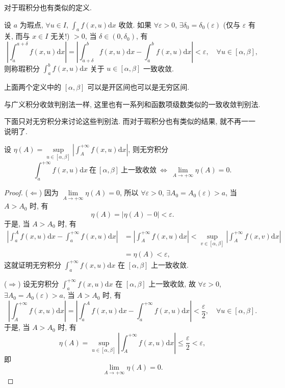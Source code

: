对于瑕积分也有类似的定义.

\begin{definition}\label{def:15.2.2}
设 $a$ 为瑕点, $\forall u\in I$, $\displaystyle\int_{a}f(x,u)\mathrm{d}x$ 收敛. 如果 $\forall\varepsilon>0$, $\exists\delta_{0}=\delta_{0}(\varepsilon)$ (仅与 $\varepsilon$ 有关, 而与 $x\in I$ 无关!) $>0$, 当 $\delta\in(0,\delta_{0})$, 有
\[
  \left|\int_{a}^{a+\delta}f(x,u)\mathrm{d}x\right|=\left|\int_{a+\delta}^{b}f(x,u)\mathrm{d}x-\int_{a}^{b}f(x,u)\mathrm{d}x\right|<\varepsilon,\quad\forall u\in[\alpha,\beta],
\]
则称瑕积分 $\displaystyle\int_{a}^{b}f(x,u)\mathrm{d}x$ 关于 $u\in[\alpha,\beta]$ 一致收敛.
\end{definition}

上面两个定义中的 $[\alpha,\beta]$ 可以是开区间也可以是无穷区间.

与广义积分收敛判别法一样, 这里也有一系列和函数项级数类似的一致收敛判别法.

下面只对无穷积分来讨论这些判别法. 而对于瑕积分也有类似的结果, 就不再一一说明了.

\begin{theorem}\label{thm:15.2.1}
设 $\eta(A)=\sup\limits_{u\in[\alpha,\beta]}\left|\int_{A}^{+\infty}f(x,u)\mathrm{d}x\right|$, 则无穷积分
\[
  \int_{a}^{+\infty}f(x,u)\mathrm{d}x\ \text{在}\ [\alpha,\beta]\ \text{上一致收敛}\ \Leftrightarrow\ \lim_{A\to+\infty}\eta(A)=0.
\]
\end{theorem}

\begin{proof}
($\Leftarrow$) 因为 $\lim\limits_{A\to+\infty}\eta(A)=0$, 所以 $\forall\varepsilon>0$, $\exists A_{0}=A_{0}(\varepsilon)>a$, 当 $A>A_{0}$ 时, 有
\[
  \eta(A)=|\eta(A)-0|<\varepsilon.
\]
于是, 当 $A>A_{0}$ 时, 有
\[
  \begin{aligned}
    \left|\int_{a}^{A}f(x,u)\mathrm{d}x-\int_{a}^{+\infty}f(x,u)\mathrm{d}x\right|&=\left|\int_{A}^{+\infty}f(x,u)\mathrm{d}x\right|<\sup_{v\in[\alpha,\beta]}\left|\int_{A}^{+\infty}f(x,v)\mathrm{d}x\right|\\
    &=\eta(A)<\varepsilon,
  \end{aligned}
\]
这就证明无穷积分 $\displaystyle\int_{a}^{+\infty}f(x,u)\mathrm{d}x$ 在 $[\alpha,\beta]$ 上一致收敛.

($\Rightarrow$) 设无穷积分 $\displaystyle\int_{a}^{+\infty}f(x,u)\mathrm{d}x$ 在 $[\alpha,\beta]$ 上一致收敛, 故 $\forall\varepsilon>0$, $\exists A_{0}=A_{0}(\varepsilon)>a$, 当 $A>A_{0}$ 时, 有
\[
  \left|\int_{A}^{+\infty}f(x,u)\mathrm{d}x\right|=\left|\int_{a}^{A}f(x,u)\mathrm{d}x-\int_{a}^{+\infty}f(x,u)\mathrm{d}x\right|<\frac{\varepsilon}{2},\quad\forall u\in[\alpha,\beta].
\]
于是, 当 $A>A_{0}$ 时, 有
\[
  \eta(A)=\sup_{u\in[\alpha,\beta]}\left|\int_{A}^{+\infty}f(x,u)\mathrm{d}x\right|\leqslant\frac{\varepsilon}{2}<\varepsilon,
\]
即
\[
  \lim_{A\to+\infty}\eta(A)=0.
\]
\end{proof}

